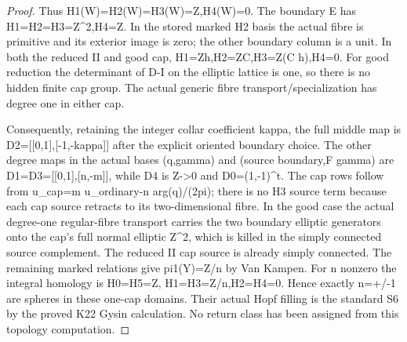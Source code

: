 \begin{proof}
Thus H1(W)=H2(W)=H3(W)=Z,H4(W)=0. The boundary E has
H1=H2=H3=Z\^{}2,H4=Z. In the stored marked H2 basis the actual
fibre is primitive and its exterior image is zero; the other
boundary column is a unit. In both the reduced II and good
cap, H1=Zh,H2=ZC,H3=Z(C h),H4=0. For good reduction
the determinant of D-I on the elliptic lattice is one, so
there is no hidden finite cap group. The actual generic
fibre transport/specialization has degree one in either cap.

Consequently, retaining the integer collar coefficient kappa,
the full middle map is D2={[}{[}0,1{]},{[}-1,-kappa{]}{]} after the
explicit oriented boundary choice. The other degree maps in
the actual bases (q,gamma) and (source boundary,F gamma) are
D1=D3={[}{[}0,1{]},{[}n,-m{]}{]}, while D4 is Z-\textgreater0 and D0=(1,-1)\^{}t.
The cap rows follow from u\_cap=m u\_ordinary-n arg(q)/(2pi);
there is no H3 source term because each cap source retracts
to its two-dimensional fibre. In the good case the actual
degree-one regular-fibre transport carries the two boundary
elliptic generators onto the cap's full normal elliptic Z\^{}2,
which is killed in the simply connected source complement.
The reduced II cap source is already simply connected. The
remaining marked relations give pi1(Y)=Z/\textbar n\textbar{} by Van Kampen.
For n nonzero the integral homology is H0=H5=Z,
H1=H3=Z/\textbar n\textbar,H2=H4=0. Hence exactly n=+/-1 are spheres
in these one-cap domains. Their actual Hopf filling is the
standard S6 by the proved K22 Gysin calculation. No return
class has been assigned from this topology computation.
\end{proof}
